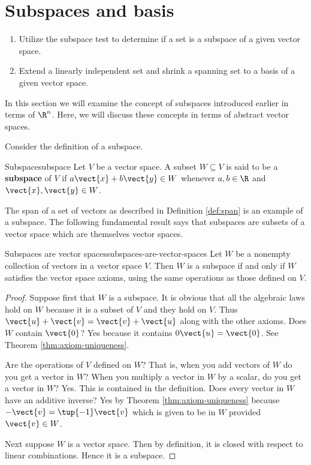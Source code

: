\section{Subspaces and basis}

\begin{outcome}
  \begin{enumerate}
  \item Utilize the subspace test to determine if a set is a subspace
    of a given vector space.
  \item Extend a linearly independent set and shrink a spanning set to
    a basis of a given vector space.
  \end{enumerate}
\end{outcome}

In this section we will examine the concept of subspaces introduced earlier in terms of $\R^n$. Here, we will discuss these concepts in terms of abstract vector spaces. 

Consider the definition of a subspace.

\begin{definition}{Subspace}{subspace}
Let $V$ be a vector space. A subset $W\subseteq V$ is said to be a \textbf{subspace} of $V$ if $a\vect{x}+b\vect{y}
\in W$ whenever $a,b\in \R$ and $\vect{x},\vect{y}\in W$.
\end{definition}

The span of a set of vectors as described in Definition \ref{def:span} is an example of a subspace. The following fundamental result says that subspaces are subsets of a
vector space which are themselves vector spaces.

\begin{theorem}{Subspaces are vector spaces}{subspaces-are-vector-spaces}
Let $W$ be a nonempty collection of vectors in a vector space $V$. Then $W$
is a subspace if and only if $W$ satisfies the vector space axioms, using the same
operations as those defined on $V$.
\end{theorem}

\begin{proof}
Suppose first that $W$ is a subspace. It is obvious that
all the algebraic laws hold on $W$ because it is a subset of $V$ and they
hold on $V$. Thus $\vect{u}+\vect{v}=\vect{v}+\vect{u}$ along with the other axioms. Does $W$
contain $\vect{0}$? Yes because it contains $0\vect{u}=\vect{0}$. See
Theorem \ref{thm:axiom-uniqueness}.

 Are the operations of $V$ defined on $W$? That is,
when you add vectors of $W$ do you get a vector in $W$? When you multiply a
vector in $W$ by a scalar, do you get a vector in $W$? Yes. This is
contained in the definition. Does every vector in $W$ have an additive
inverse? Yes by Theorem \ref{thm:axiom-uniqueness} because $-\vect{v}=\tup{
-1} \vect{v}$ which is given to be in $W$ provided $\vect{v}\in W$.

Next suppose $W$ is a vector space. Then by definition, it is closed with
respect to linear combinations. Hence it is a subspace. 
\end{proof}

